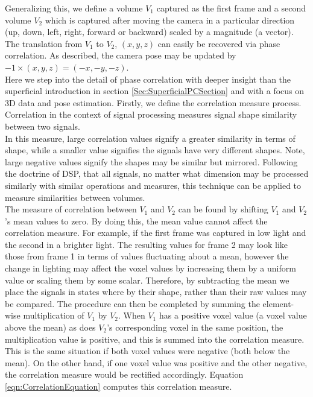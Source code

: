 Generalizing this, we define a volume $V_1$ captured as the first frame and a second volume $V_2$ which is captured after moving the camera in a particular direction (up, down, left, right, forward or backward) scaled by a magnitude (a vector). The translation from $V_1$ to $V_2$, $(x,y,z)$ can easily be recovered via phase correlation. As described, the camera pose may be updated by $-1 \times (x,y,z) = (-x,-y,-z)$. \\

Here we step into the detail of phase correlation with deeper insight than the superficial introduction in section \ref{Sec:SuperficialPCSection} and with a focus on 3D data and pose estimation. Firstly, we define the correlation measure process. Correlation in the context of signal processing measures signal shape similarity between two signals. \\

In this measure, large correlation values signify a greater similarity in terms of shape, while a smaller value signifies the signals have very different shapes. Note, large negative values signify the shapes may be similar but mirrored. Following the doctrine of DSP, that all signals, no matter what dimension may be processed similarly with similar operations and measures, this technique can be applied to measure similarities between volumes.  \\

The measure of correlation between $V_1$ and $V_2$ can be found by shifting $V_1$ and $V_2$'s mean values to zero. By doing this, the mean value cannot affect the correlation measure. For example, if the first frame was captured in low light and the second in a brighter light. The resulting values for frame 2 may look like those from frame 1 in terms of values fluctuating about a mean, however the change in lighting may affect the voxel values by increasing them by a uniform value or scaling them by some scalar. Therefore, by subtracting the mean we place the signals in states where by their shape, rather than their raw values may be compared. The procedure can then be completed by summing the element-wise multiplication of $V_1$ by $V_2$. When $V_1$ has a positive voxel value (a voxel value above the mean) as does $V_2$'s corresponding voxel in the same position, the multiplication value is positive, and this is summed into the correlation measure. This is the same situation if both voxel values were negative (both below the mean). On the other hand, if one voxel value was positive and the other negative, the correlation measure would be rectified accordingly. Equation \ref{eqn:CorrelationEquation} computes this correlation measure. 

